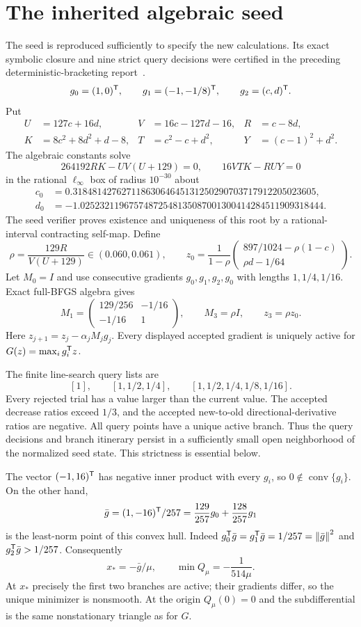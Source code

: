 \documentclass[10pt,oneside,openany]{book}
\theoremstyle{remark}\newtheorem{remark}{Remark}[chapter]
\begin{document}
\section{The inherited algebraic seed}
The seed is reproduced sufficiently to specify the new calculations. Its exact symbolic closure and nine strict query decisions were certified in the preceding deterministic-bracketing report~\cite{SD}.
\[
 g_0=(1,0)^{\mathsf T},\qquad g_1=(-1,-1/8)^{\mathsf T},\qquad g_2=(c,d)^{\mathsf T}.
\]
Put
\begin{align*}
 U&=127c+16d,&V&=16c-127d-16,&R&=c-8d,\\
 K&=8c^2+8d^2+d-8,&T&=c^2-c+d^2,&Y&=(c-1)^2+d^2.
\end{align*}
The algebraic constants solve
\[
 264192RK-UV(U+129)=0,\qquad 16VTK-RUY=0
\]
in the rational $\ell_\infty$ box of radius $10^{-30}$ about
\begin{align*}
 c_0&=0.31848142762711863064645131250290703717912205023605,\\
 d_0&=-1.02523211967574872548135087001300414284511909318444.
\end{align*}
The seed verifier proves existence and uniqueness of this root by a rational-interval contracting self-map. Define
\[
 \rho=\frac{129R}{V(U+129)}\in(0.060,0.061),\qquad
 z_0=\frac1{1-\rho}
 \begin{pmatrix}897/1024-\rho(1-c)\\ \rho d-1/64\end{pmatrix}.
\]
Let $M_0=I$ and use consecutive gradients $g_0,g_1,g_2,g_0$ with lengths $1,1/4,1/16$. Exact full-BFGS algebra gives
\[
 M_1=\begin{pmatrix}129/256&-1/16\\-1/16&1\end{pmatrix},
 \qquad M_3=\rho I,\qquad z_3=\rho z_0.
\]
Here $z_{j+1}=z_j-\alpha_jM_jg_j$. Every displayed accepted gradient is uniquely active for $G(z)=\max_i g_i^{\mathsf T} z$.

The finite line-search query lists are
\[
 [1],\qquad[1,1/2,1/4],\qquad[1,1/2,1/4,1/8,1/16].
\]
Every rejected trial has a value larger than the current value. The accepted decrease ratios exceed $1/3$, and the accepted new-to-old directional-derivative ratios are negative. All query points have a unique active branch. Thus the query decisions and branch itinerary persist in a sufficiently small open neighborhood of the normalized seed state. This strictness is essential below.

The vector $(-1,16)^{\mathsf T}$ has negative inner product with every $g_i$, so $0\notin\operatorname{conv}\{g_i\}$. On the other hand,
\[
 \bar g=(1,-16)^{\mathsf T}/257
 =\frac{129}{257}g_0+\frac{128}{257}g_1
\]
is the least-norm point of this convex hull. Indeed $g_0^{\mathsf T}\bar g=g_1^{\mathsf T}\bar g=1/257=\left\lVert\bar g\right\rVert^2$ and $g_2^{\mathsf T}\bar g>1/257$. Consequently
\begin{equation}\label{L:eq:minimizer}
 x_*=-\bar g/\mu,\qquad \min Q_\mu=-\frac1{514\mu}.
\end{equation}
At $x_*$ precisely the first two branches are active; their gradients differ, so the unique minimizer is nonsmooth. At the origin $Q_\mu(0)=0$ and the subdifferential is the same nonstationary triangle as for $G$.
\end{document}
